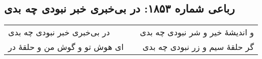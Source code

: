 \begin{center}
\section*{رباعی شماره ۱۸۵۳: در بی‌خبری خبر نبودی چه بدی}
\label{sec:1853}
\begin{longtable}{l p{0.5cm} r}
در بی‌خبری خبر نبودی چه بدی
&&
و اندیشهٔ خیر و شر نبودی چه بدی
\\
ای هوش تو و گوش من و حلقهٔ در
&&
گر حلقهٔ سیم و زر نبودی چه بدی
\\
\end{longtable}
\end{center}
